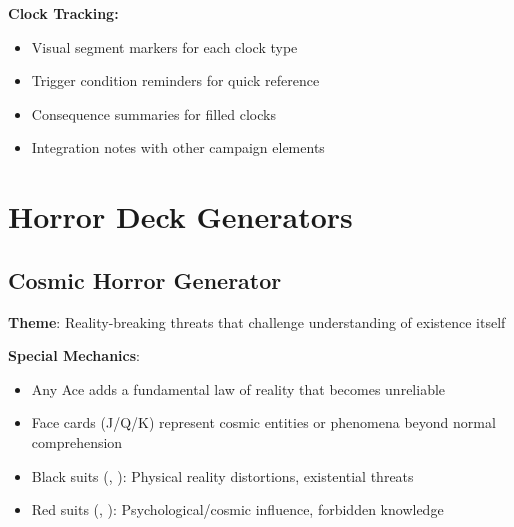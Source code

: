 \documentclass[11pt]{article}
\begin{document}
\textbf{Clock Tracking:}
\begin{itemize}
\item Visual segment markers for each clock type
\item Trigger condition reminders for quick reference
\item Consequence summaries for filled clocks
\item Integration notes with other campaign elements
\end{itemize}

\section{Horror Deck Generators}

\subsection{Cosmic Horror Generator}

\begin{mdframed}[backgroundcolor=shadecolor]
\textbf{Theme}: Reality-breaking threats that challenge understanding of existence itself

\textbf{Special Mechanics}:
\begin{itemize}[leftmargin=*]
\item Any Ace adds a fundamental law of reality that becomes unreliable
\item Face cards (J/Q/K) represent cosmic entities or phenomena beyond normal comprehension
\item Black suits (\spadesuit, \clubsuit): Physical reality distortions, existential threats
\item Red suits (\heartsuit, \diamondsuit): Psychological/cosmic influence, forbidden knowledge
\end{itemize}
\end{mdframed}
\end{document}
